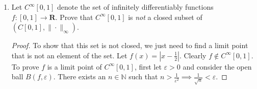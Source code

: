 \documentclass{article}
\newcommand{\R}{\mathbf{R}}
\theoremstyle{plain} %
\numberwithin{thm}{section} %
\theoremstyle{definition}
\begin{document}
        \begin{enumerate}[label=(\alph*)]
            \item Let $C^\infty[0,1]$ denote the set of infinitely differentiably functions $f:[0,1]\rightarrow \R$. Prove that $C^\infty[0,1]$ is \textit{not} a closed subset of $(C[0,1],\|\cdot\|_\infty)$.
    
            \begin{proof}
                To show that this set is not closed, we just need to find a limit point that is not an element of the set. Let \(f(x) = |x-\frac{1}{2}|\). Clearly \(f \notin C^{\infty} [0,1]\). To prove \(f\) is a limit point of \(C^{\infty} [0,1]\), first let \(\varepsilon > 0\) and consider the open ball \(B(f, \varepsilon)\). There exists an \(n \in \mathbb{N}\) such that \(n > \frac{1}{\varepsilon^2} \implies \frac{1}{\sqrt{n}} < \varepsilon\).
    

\end{proof}
\end{enumerate}
\end{document}
